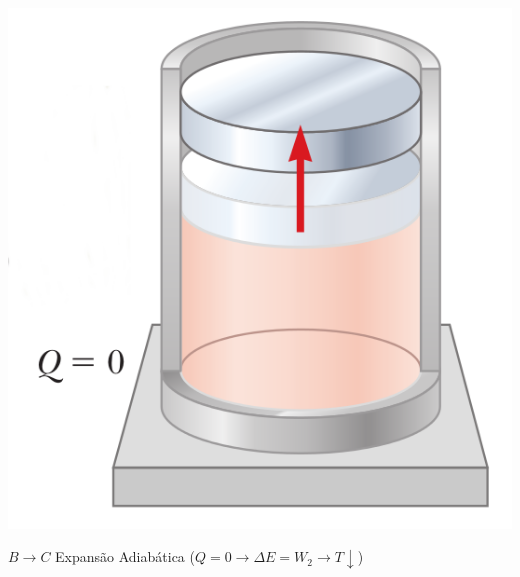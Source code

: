 \documentclass[t,%
brazilian,%
11pt,%
aspectratio=169,%
table%
]{beamer}
\begin{document}
\begin{frame}
\begin{columns}
        \pause 
        \begin{column}{0.45\textwidth}
            \centering
            \includegraphics[height=0.45\textheight-32pt]{images/carnot-b.png}

            \(B \rightarrow C\) Expansão Adiabática (\(Q=0 \rightarrow \Delta E = W_2 \rightarrow T \downarrow \))
        \end{column}
    \end{columns}


\end{frame}
\end{document}
